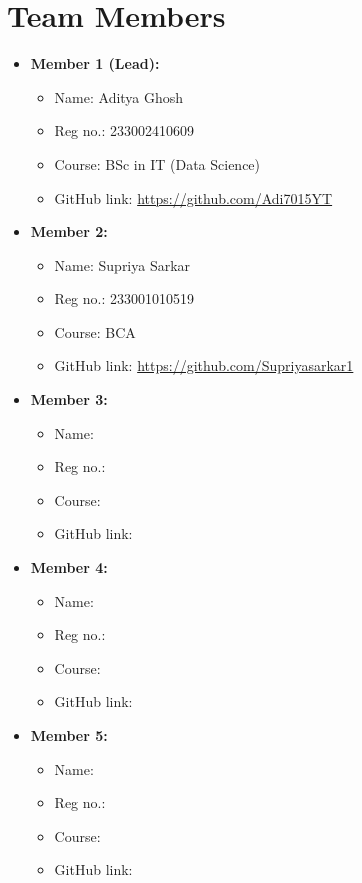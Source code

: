 \documentclass[a4paper,12pt]{article}
\begin{document}
\section*{Team Members}
\begin{itemize}
    \item \textbf{Member 1 (Lead):} 
    \begin{itemize}
        \item Name: Aditya Ghosh
        \item Reg no.: 233002410609
        \item Course: BSc in IT (Data Science)
        \item GitHub link: \url{https://github.com/Adi7015YT}
    \end{itemize}

    \item \textbf{Member 2:} 
    \begin{itemize}
        \item Name: Supriya Sarkar
        \item Reg no.: 233001010519
        \item Course: BCA
        \item GitHub link: \url{https://github.com/Supriyasarkar1}
    \end{itemize}

    \item \textbf{Member 3:} 
    \begin{itemize}
        \item Name: 
        \item Reg no.: 
        \item Course: 
        \item GitHub link: \url{}
    \end{itemize}

    \item \textbf{Member 4:} 
    \begin{itemize}
        \item Name: 
        \item Reg no.: 
        \item Course: 
        \item GitHub link: \url{}
    \end{itemize}

    \item \textbf{Member 5:} 
    \begin{itemize}
        \item Name: 
        \item Reg no.: 
        \item Course: 
        \item GitHub link: \url{}
    \end{itemize}
\end{itemize}
\end{document}
